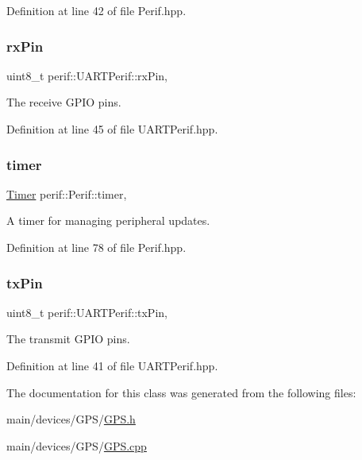 Definition at line 42 of file Perif.\+hpp.

\mbox{\label{classperif_1_1UARTPerif_a68a86b1e2ca06e42ef72fb4ca0792110}} 
\subsubsection{\texorpdfstring{rxPin}{rxPin}}
{\footnotesize\ttfamily uint8\+\_\+t perif\+::\+U\+A\+R\+T\+Perif\+::rx\+Pin\hspace{0.3cm}{\ttfamily [protected]}, {\ttfamily [inherited]}}

The receive G\+P\+IO pins. 

Definition at line 45 of file U\+A\+R\+T\+Perif.\+hpp.

\mbox{\label{classperif_1_1Perif_acfa1256201bead82ccce1a0a8bcc24e1}} 
\subsubsection{\texorpdfstring{timer}{timer}}
{\footnotesize\ttfamily \mbox{\hyperlink{classTimer}{Timer}} perif\+::\+Perif\+::timer\hspace{0.3cm}{\ttfamily [protected]}, {\ttfamily [inherited]}}

A timer for managing peripheral updates. 

Definition at line 78 of file Perif.\+hpp.

\mbox{\label{classperif_1_1UARTPerif_a338fb2e5db8bd91213b13524ac9d89aa}} 
\subsubsection{\texorpdfstring{txPin}{txPin}}
{\footnotesize\ttfamily uint8\+\_\+t perif\+::\+U\+A\+R\+T\+Perif\+::tx\+Pin\hspace{0.3cm}{\ttfamily [protected]}, {\ttfamily [inherited]}}

The transmit G\+P\+IO pins. 

Definition at line 41 of file U\+A\+R\+T\+Perif.\+hpp.



The documentation for this class was generated from the following files\+:\begin{DoxyCompactItemize}
\item 
main/devices/\+G\+P\+S/\mbox{\hyperlink{GPS_8h}{G\+P\+S.\+h}}\item 
main/devices/\+G\+P\+S/\mbox{\hyperlink{GPS_8cpp}{G\+P\+S.\+cpp}}\end{DoxyCompactItemize}

